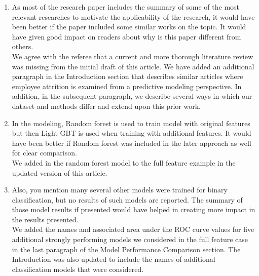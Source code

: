 \documentclass{amsart}[12pt]
\begin{document}
\begin{enumerate}
    \item   {\color{blue}
        As most of the research paper includes the summary of some of the most relevant researches to motivate the applicability of the research, it would have been better if the paper included some similar works on the topic.
        It would have given good impact on readers about why is this paper different from others. 
        }\\

We agree with the referee that a current and more thorough literature review was missing from the 
initial draft of this article.  We have added an additional paragraph in the Introduction section 
that describes similar articles where employee attrition is examined from a predictive modeling 
perspective.  In addition, in the subsequent paragraph, we describe several ways in which 
our dataset and methods differ and extend upon this prior work. 

        \hspace{10pt}

    \item   {\color{blue}
        In the modeling, Random forest is used to train model with original features but then Light GBT is used when training with additional features. It would have been better if Random forest was included in the later approach as well for clear comparison. 
        }\\

        We added in the random forest model to the full feature example in the updated version of this article.

        \hspace{10pt}

    \item   {\color{blue}
   Also, you mention many several other models were trained for binary classification, but no results of such models are reported. The summary of those model results if presented would have helped in creating more impact in the results presented. 
        }\\

        We added the names and associated area under the ROC curve values for five additional strongly performing 
        models we considered in the full feature case in the last paragraph of the Model Performance 
        Comparison section.  The Introduction was also updated to include the names of additional 
        classification models that were considered.


\end{enumerate}
\end{document}
